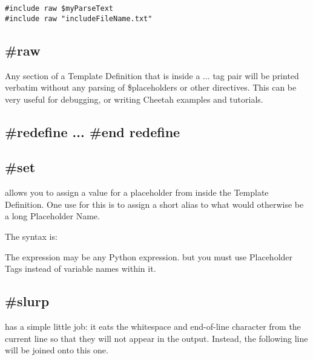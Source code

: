 \begin{verbatim}
#include raw $myParseText
#include raw "includeFileName.txt"
\end{verbatim}


\subsection{\#raw}

Any section of a Template Definition that is inside a  ...
 tag pair will be printed verbatim without any parsing of
\$placeholders or other directives.  This can be very useful for debugging, or
writing Cheetah examples and tutorials.


\subsection{\#redefine ... \#end redefine}




\subsection{\#set}

 allows you to assign a value for a placeholder from inside the
Template Definition.  One use for this is to assign a short alias to what would
otherwise be a long Placeholder Name. 

The syntax is: 

The expression may be any Python expression. but you must use Placeholder Tags
instead of variable names within it.


\subsection{\#slurp}

 has a simple little job: it eats the whitespace and end-of-line
character from the current line so that they will not appear in the output.
Instead, the following line will be joined onto this one.


